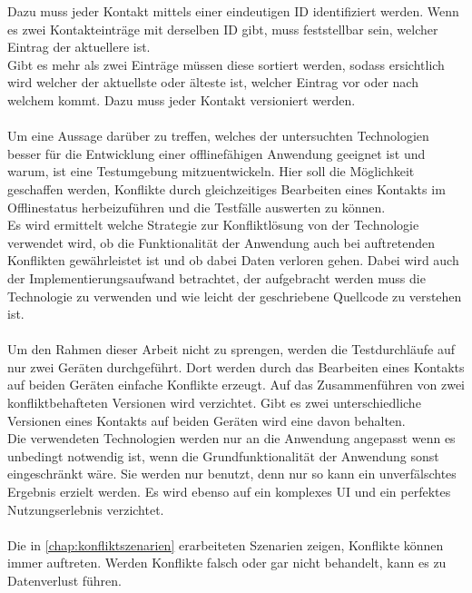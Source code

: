 Dazu muss jeder Kontakt mittels einer eindeutigen ID identifiziert werden. Wenn es zwei Kontakteinträge mit derselben ID gibt, muss feststellbar sein, welcher Eintrag der aktuellere ist.\\
Gibt es mehr als zwei Einträge müssen diese sortiert werden, sodass ersichtlich wird welcher der aktuellste oder älteste ist, welcher Eintrag vor oder nach welchem kommt. Dazu muss jeder Kontakt versioniert werden.\\\\
Um eine Aussage darüber zu treffen, welches der untersuchten Technologien besser für die Entwicklung einer offlinefähigen Anwendung geeignet ist und warum, ist eine Testumgebung mitzuentwickeln. Hier soll die Möglichkeit geschaffen werden, Konflikte durch gleichzeitiges Bearbeiten eines Kontakts im Offlinestatus herbeizuführen und die Testfälle auswerten zu können.\\
Es wird ermittelt welche Strategie zur Konfliktlösung von der Technologie verwendet wird, ob die Funktionalität der Anwendung auch bei auftretenden Konflikten gewährleistet ist und ob dabei Daten verloren gehen.
Dabei wird auch der Implementierungsaufwand betrachtet, der aufgebracht werden muss die Technologie zu verwenden und wie leicht der geschriebene Quellcode zu verstehen ist.\\\\
%
%
Um den Rahmen dieser Arbeit nicht zu sprengen, werden die Testdurchläufe auf nur zwei Geräten durchgeführt.
Dort werden durch das Bearbeiten eines Kontakts auf beiden Geräten einfache Konflikte erzeugt.
Auf das Zusammenführen von zwei konfliktbehafteten Versionen wird verzichtet.
Gibt es zwei unterschiedliche Versionen eines Kontakts auf beiden Geräten wird eine davon behalten.\\
Die verwendeten Technologien werden nur an die Anwendung angepasst wenn es unbedingt notwendig ist, wenn die Grundfunktionalität der Anwendung sonst eingeschränkt wäre. Sie werden nur benutzt, denn nur so kann ein unverfälschtes Ergebnis erzielt werden.
Es wird ebenso auf ein komplexes \gls{UI} und ein perfektes Nutzungserlebnis verzichtet.\\\\
%
%
Die in \autoref{chap:konfliktszenarien} erarbeiteten Szenarien zeigen, Konflikte können immer auftreten. Werden Konflikte falsch oder gar nicht behandelt, kann es zu Datenverlust führen.
